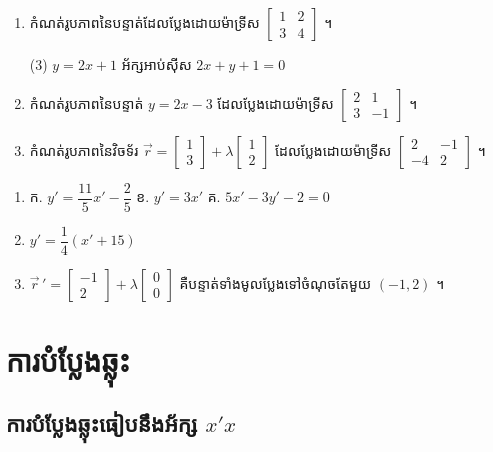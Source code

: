 \begin{pro}
\begin{enumerate}[1]
  \item កំណត់រូបភាពនៃបន្ទាត់ដែលប្លែងដោយម៉ាទ្រីស $\begin{bmatrix} 1 & 2\\ 3 & 4 \end{bmatrix}$ ។
  \begin{tasks}(3)
    \task $y = 2x + 1$
    \task អ័ក្សអាប់ស៊ីស
    \task $2x + y + 1 = 0$
  \end{tasks}
  \item កំណត់រូបភាពនៃបន្ទាត់ $y = 2x - 3$ ដែលប្លែងដោយម៉ាទ្រីស $\begin{bmatrix} 2 & 1\\ 3 & -1 \end{bmatrix}$ ។
  \item កំណត់រូបភាពនៃវិចទ័រ $\overrightarrow{r} = \begin{bmatrix} 1\\ 3 \end{bmatrix} + \lambda\begin{bmatrix} 1\\ 2 \end{bmatrix}$ ដែលប្លែងដោយម៉ាទ្រីស $\begin{bmatrix} 2 & -1\\ -4 & 2 \end{bmatrix}$ ។
\end{enumerate}
\ans
\begin{enumerate}[1]
  \item ក. $y' = \dfrac{11}{5}x' - \dfrac{2}{5}$ \quad ខ. $y' = 3x'$ \quad គ. $5x' - 3y' - 2 = 0$
  \item $y' = \dfrac{1}{4}(x' + 15)$
  \item $\overrightarrow{r}\,' = \begin{bmatrix} -1\\ 2 \end{bmatrix} + \lambda\begin{bmatrix} 0\\ 0 \end{bmatrix}$ គឺបន្ទាត់ទាំងមូលប្លែងទៅចំណុចតែមួយ $(-1, 2)$ ។
\end{enumerate}
\end{pro}

\section{ការបំប្លែងឆ្លុះ}
\subsection{ការបំប្លែងឆ្លុះធៀបនឹងអ័ក្ស \texorpdfstring{$x'x$}{x'x}}

